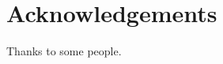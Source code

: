 \documentclass[12pt, oneside]{report}
\begin{document}
\chapter*{Acknowledgements}
Thanks to some people.

\clearpage
\setcounter{page}{1}










\end{document}

